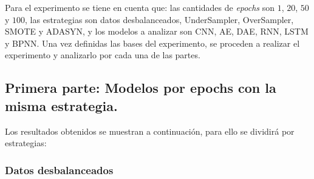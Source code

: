   Para el experimento se tiene en cuenta que: las cantidades de \textit{epochs} son $1$, $20$, $50$ y $100$, las estrategias son datos desbalanceados, UnderSampler, OverSampler, SMOTE y ADASYN, y los modelos a analizar son CNN, AE, DAE, RNN, LSTM y BPNN. Una vez definidas las bases del experimento, se proceden a realizar el experimento y analizarlo por cada una de las partes.

\subsection{Primera parte: Modelos por epochs con la misma estrategia.}

  Los resultados obtenidos se muestran a continuaci\'{o}n, para ello se dividir\'{a} por estrategias:
  
  \subsubsection{Datos desbalanceados}
